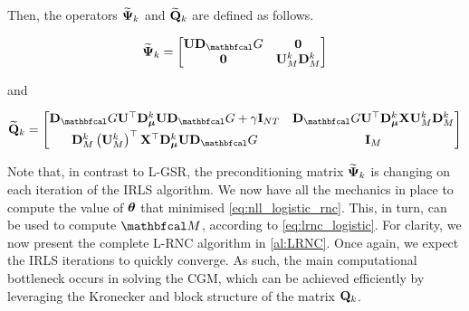 Then, the operators $\widetilde{\mathbf{\Psi}}_k$ and $\widetilde{\mathbf{Q}}_k$ are defined as follows. 

\begin{equation}
    \widetilde{\PSI}_k = \begin{bmatrix}
        \U \D_\Gt & \zero \\
        \zero & \U_M^k \D_M^k
    \end{bmatrix}
\end{equation}

and 

\begin{equation}
    \widetilde{\Q}_k = 
       \begin{bmatrix}
        \D_\Gt \U^\top \D_{\muu}^k \U \D_\Gt + \gamma \I_{NT}  &  \D_\Gt \U^\top \D_{\muu}^k \X \U_M^k \D_M^k \\[0.1cm] 
        \D_M^k \left(\U_M^k\right)^\top \X^\top \D_{\muu}^k \U \D_\Gt & \I_M
        \end{bmatrix}
\end{equation}

Note that, in contrast to L-GSR, the preconditioning matrix $\widetilde{\mathbf{\Psi}}_k$ is changing on each iteration of the IRLS algorithm. We now have all the mechanics in place to compute the value of $\boldsymbol{\theta}$ that minimised \cref{eq:nll_logistic_rnc}. This, in turn, can be used to compute $\Mt$, according to \cref{eq:lrnc_logistic}. For clarity, we now present the complete L-RNC algorithm in \cref{al:LRNC}. Once again, we expect the IRLS iterations to quickly converge. As such, the main computational bottleneck occurs in solving the CGM, which can be achieved efficiently by leveraging the Kronecker and block structure of the matrix $\mathbf{Q}_k$. 


